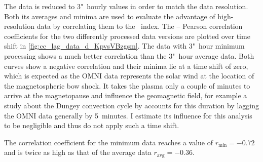 The data is reduced to 3"~hourly values in order to match the \Kp{} data resolution. Both its averages and minima are used to evaluate the advantage of high-resolution data by correlating them to the \Kp~index. The \Kp{}--\vBz{} Pearson correlation coefficients for the two differently processed data versions are plotted over time shift in \autoref{fig:cc_lag_data_d_KpvsVBzgsm}. The data with 3"~hour minimum processing shows a much better correlation than the 3"~hour average data. Both curves show a negative correlation and their minima lie at a time shift of zero, which is expected as the OMNI data represents the solar wind at the location of the magnetospheric bow shock. It takes the plasma only a couple of minutes to arrive at the magnetopause and influence the geomagnetic field, for example a study about the Dungey convection cycle by \citet{Zhang2015} accounts for this duration by lagging the OMNI data generally by 5~minutes. I estimate its influence for this analysis to be negligible and thus do not apply such a time shift.

The correlation coefficient for the minimum data reaches a value of $r_\text{min} = -0.72$ and is twice as high as that of the average data $r_\text{avg} = -0.36$.



